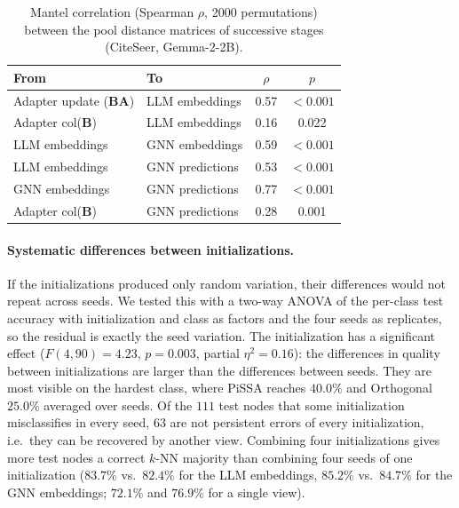 \documentclass[a4paper,fleqn]{cas-sc}
\DeclareRobustCommand{\revcommon}[2][]{\textcolor{revshared}{#2}} %
\begin{document}
\begin{table}[htbp]
\centering\color{revshared}
\caption{Mantel correlation (Spearman $\rho$, 2000 permutations) between the pool distance matrices of successive stages (CiteSeer, Gemma-2-2B).}
\label{tab:mantel}
\small
\begin{tabular}{llcc}
\toprule
\textbf{From} & \textbf{To} & \textbf{$\rho$} & \textbf{$p$} \\
\midrule
Adapter update ($\mathbf{B}\mathbf{A}$) & LLM embeddings  & 0.57 & $<0.001$ \\
Adapter col($\mathbf{B}$)               & LLM embeddings  & 0.16 & 0.022 \\
LLM embeddings                          & GNN embeddings  & 0.59 & $<0.001$ \\
LLM embeddings                          & GNN predictions & 0.53 & $<0.001$ \\
GNN embeddings                          & GNN predictions & 0.77 & $<0.001$ \\
Adapter col($\mathbf{B}$)               & GNN predictions & 0.28 & 0.001 \\
\bottomrule
\end{tabular}
\end{table}

\paragraph{\revcommon{Systematic differences between initializations.}}
\revcommon[R1,R2,R4]{If the initializations produced only random variation, their differences would not repeat across seeds. We tested this with a two-way ANOVA of the per-class test accuracy with initialization and class as factors and the four seeds as replicates, so the residual is exactly the seed variation. The initialization has a significant effect ($F(4,90)=4.23$, $p=0.003$, partial $\eta^2=0.16$): the differences in quality between initializations are larger than the differences between seeds. They are most visible on the hardest class, where PiSSA reaches $40.0\%$ and Orthogonal $25.0\%$ averaged over seeds. Of the $111$ test nodes that some initialization misclassifies in every seed, $63$ are not persistent errors of every initialization, i.e.\ they can be recovered by another view. Combining four initializations gives more test nodes a correct $k$-NN majority than combining four seeds of one initialization ($83.7\%$ vs.\ $82.4\%$ for the LLM embeddings, $85.2\%$ vs.\ $84.7\%$ for the GNN embeddings; $72.1\%$ and $76.9\%$ for a single view).}
\end{document}
